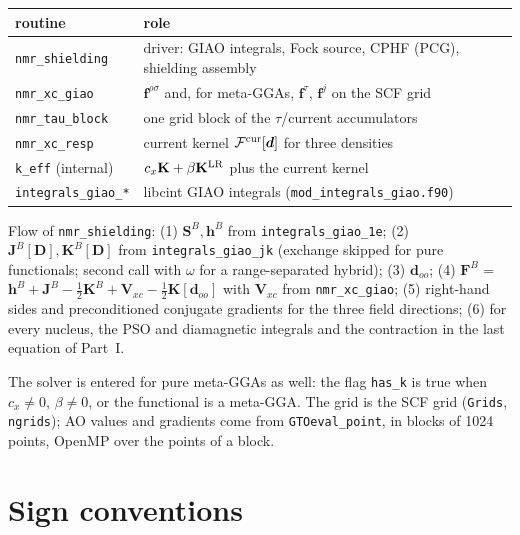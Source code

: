 \documentclass[11pt,a4paper]{article}
\newcommand{\Dm}{\mathbf{D}}
\begin{document}
\begin{center}
\begin{tabular}{ll}
\toprule
routine & role\\
\midrule
\texttt{nmr\_shielding} & driver: GIAO integrals, Fock source, CPHF (PCG), shielding assembly\\
\texttt{nmr\_xc\_giao} & $\bm f^{\rho\sigma}$ and, for meta-GGAs, $\bm f^{\tau}$, $\bm f^{j}$ on the SCF grid\\
\texttt{nmr\_tau\_block} & one grid block of the $\tau$/current accumulators\\
\texttt{nmr\_xc\_resp} & current kernel $\mathcal F^{\rm cur}[\bm d]$ for three densities\\
\texttt{k\_eff} (internal) & $c_x\mathbf K+\beta\mathbf K^{\rm LR}$ plus the current kernel\\
\texttt{integrals\_giao\_*} & libcint GIAO integrals (\texttt{mod\_integrals\_giao.f90})\\
\bottomrule
\end{tabular}
\end{center}

Flow of \texttt{nmr\_shielding}: (1) $\bm S^B,\bm h^B$ from \texttt{integrals\_giao\_1e}; (2) $\bm J^B[\Dm],\bm K^B[\Dm]$ from \texttt{integrals\_giao\_jk} (exchange skipped for pure functionals; second call with $\omega$ for a range-separated hybrid); (3) $\bm d_{oo}$; (4) $\bm F^B$ = $\bm h^B+\bm J^B-\tfrac12\bm K^B+\bm V_{xc}-\tfrac12\mathbf K[\bm d_{oo}]$ with $\bm V_{xc}$ from \texttt{nmr\_xc\_giao}; (5) right-hand sides and preconditioned conjugate gradients for the three field directions; (6) for every nucleus, the PSO and diamagnetic integrals and the contraction in the last equation of Part~I.

The solver is entered for pure meta-GGAs as well: the flag \texttt{has\_k} is true when $c_x\neq0$, $\beta\ne0$, or the functional is a meta-GGA. The grid is the SCF grid (\texttt{Grids}, \texttt{ngrids}); AO values and gradients come from \texttt{GTOeval\_point}, in blocks of 1024 points, OpenMP over the points of a block.

\section{Sign conventions}\label{sec:conv}
\end{document}
